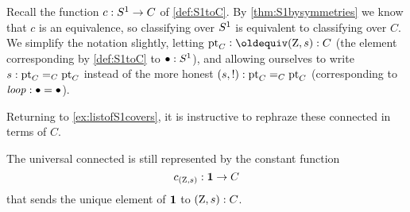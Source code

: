  Recall the function $c:S^1\to C$ of \cref{def:S1toC}.  By \cref{thm:S1bysymmetries} we know that $c$ is an equivalence, so classifying \coverings over $S^1$ is equivalent to classifying \coverings over $C$.  
We simplify the notation slightly, letting $\pt_C\defequi(\zet,s):C$ (the element corresponding by \cref{def:S1toC} to $\bullet:S^1$), and allowing ourselves to write $s:{\mathord{\mathrm{pt}}}_C=_C{\mathord{\mathrm{pt}}}_C$ instead of the more honest $(s,!):{\mathord{\mathrm{pt}}}_C=_C{\mathord{\mathrm{pt}}}_C$ (corresponding to $\mathit{loop}:\bullet=\bullet$).

 Returning to \cref{ex:listofS1covers}, it is instructive to rephraze these connected \coverings in terms of $C$.
\begin{example}
 \label{ex:listofCcovers}\label{ex:Cunivcov}
The universal connected \covering is still represented by the constant function
    $$c_{(\mathrm{Z},s)}:\mathbf{1}\to C$$ that sends the unique element of $\mathbf{1}$ to $(\mathrm{Z},s):C$.
    \end{example}
